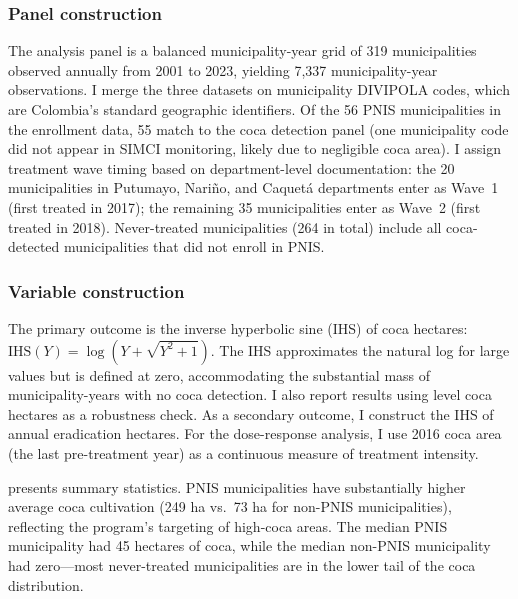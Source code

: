 \documentclass[12pt]{article}
\begin{document}
\subsubsection*{Panel construction} The analysis panel is a balanced municipality-year grid of 319 municipalities observed annually from 2001 to 2023, yielding 7,337 municipality-year observations. I merge the three datasets on municipality DIVIPOLA codes, which are Colombia's standard geographic identifiers. Of the 56 PNIS municipalities in the enrollment data, 55 match to the coca detection panel (one municipality code did not appear in SIMCI monitoring, likely due to negligible coca area). I assign treatment wave timing based on department-level documentation: the 20 municipalities in Putumayo, Nari\~{n}o, and Caquet\'{a} departments enter as Wave~1 (first treated in 2017); the remaining 35 municipalities enter as Wave~2 (first treated in 2018). Never-treated municipalities (264 in total) include all coca-detected municipalities that did not enroll in PNIS.

\subsubsection*{Variable construction} The primary outcome is the inverse hyperbolic sine (IHS) of coca hectares: $\text{IHS}(Y) = \log(Y + \sqrt{Y^2 + 1})$. The IHS approximates the natural log for large values but is defined at zero, accommodating the substantial mass of municipality-years with no coca detection. I also report results using level coca hectares as a robustness check. As a secondary outcome, I construct the IHS of annual eradication hectares. For the dose-response analysis, I use 2016 coca area (the last pre-treatment year) as a continuous measure of treatment intensity.

 presents summary statistics. PNIS municipalities have substantially higher average coca cultivation (249 ha vs.\ 73 ha for non-PNIS municipalities), reflecting the program's targeting of high-coca areas. The median PNIS municipality had 45 hectares of coca, while the median non-PNIS municipality had zero---most never-treated municipalities are in the lower tail of the coca distribution.
\end{document}
